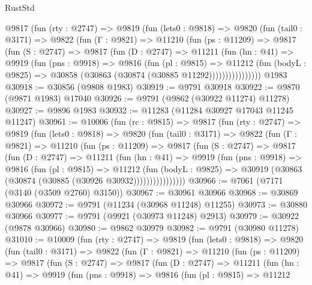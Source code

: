 \begin{lexlean}{RustStd}
\begin{coremodule}
      @9817
        (fun (rty : @2747) =>
        @9819
          (fun (lets0 : @9818) =>
          @9820
            (fun (tail0 : @3171) =>
            @9822
              (fun (Γ : @9821) =>
              @11210
                (fun (ps : @11209) =>
                @9817
                  (fun (S : @2747) =>
                  @9817
                    (fun (D : @2747) =>
                    @11211
                      (fun (hn : @41) =>
                      @9919
                        (fun (pns : @9918) =>
                        @9816
                          (fun (pl : @9815) =>
                          @11212
                            (fun (bodyL : @9825) =>
                            @30858 (@30863 (@30874 (@30885 @11292))))))))))))))))
    @1983
@30918 := @30856 (@9808 @1983)
@30919 := @9791 @30918
@30922 := @9870 (@9871 @1983) @17040
@30926 := @9791 (@9862 (@30922 @11274) @11278)
@30927 := @9896 @1983
@30932 := @11283 (@11284 @30927 @17043 @11245 @11247)
@30961 := @10006
    (fun (rc : @9815) =>
    @9817
      (fun (rty : @2747) =>
      @9819
        (fun (lets0 : @9818) =>
        @9820
          (fun (tail0 : @3171) =>
          @9822
            (fun (Γ : @9821) =>
            @11210
              (fun (ps : @11209) =>
              @9817
                (fun (S : @2747) =>
                @9817
                  (fun (D : @2747) =>
                  @11211
                    (fun (hn : @41) =>
                    @9919
                      (fun (pns : @9918) =>
                      @9816
                        (fun (pl : @9815) =>
                        @11212
                          (fun (bodyL : @9825) =>
                          @30919 (@30863 (@30874 (@30885 (@30926 @30932))))))))))))))))
@30966 := @7061 (@7171 (@3140 (@3509 @2760) @3150))
@30967 := @30961 @30966
@30968 := @30869 @30966
@30972 := @9791 (@11234 (@30968 @11248) @11255)
@30973 := @30880 @30966
@30977 := @9791 (@9921 (@30973 @11248) @2913)
@30979 := @30922 (@9878 @30966)
@30980 := @9862 @30979
@30982 := @9791 (@30980 @11278)
@31010 := @10009
    (fun (rty : @2747) =>
    @9819
      (fun (lets0 : @9818) =>
      @9820
        (fun (tail0 : @3171) =>
        @9822
          (fun (Γ : @9821) =>
          @11210
            (fun (ps : @11209) =>
            @9817
              (fun (S : @2747) =>
              @9817
                (fun (D : @2747) =>
                @11211
                  (fun (hn : @41) =>
                  @9919
                    (fun (pns : @9918) =>
                    @9816
                      (fun (pl : @9815) =>
                      @11212

\end{coremodule}
\end{lexlean}
